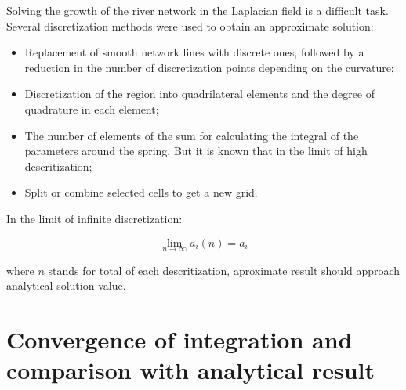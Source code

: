 \documentclass[]{pracamgr}
\begin{document}
    Solving the growth of the river network in the Laplacian field is a difficult task. Several discretization methods were used to obtain an approximate solution: 
    
    \begin{itemize}
      \item Replacement of smooth network lines with discrete ones, followed by a reduction in the number of discretization points depending on the curvature;
      \item Discretization of the region into quadrilateral elements and the degree of quadrature in each element;
      \item The number of elements of the sum for calculating the integral of the parameters around the spring. But it is known that in the limit of high descritization;
      \item Split or combine selected cells to get a new grid.
    \end{itemize}
    
    In the limit of infinite discretization: 

    \begin{equation}
      \label{convergence}
      \lim_{n \to \infty} a_i(n)  = a_i
    \end{equation}

    where $n$ stands for total of each descritization, aproximate result should approach analytical solution value.
    
    \section{Convergence of integration and comparison with analytical result}
\end{document}
